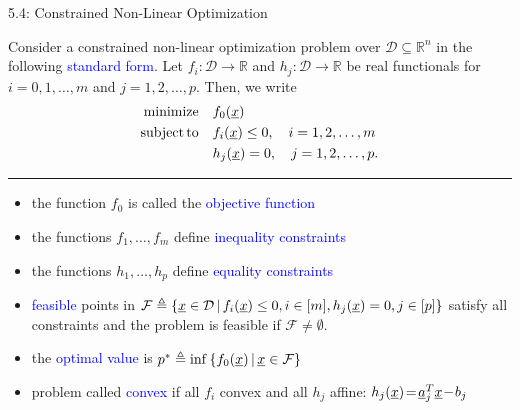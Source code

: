 \documentclass[10pt,letterpaper,english]{beamer}
\begin{document}
\begin{frame}{5.4: Constrained Non-Linear Optimization}

Consider a constrained non-linear optimization problem over $\mathcal{D} \subseteq \mathbb{R}^n$  in the following \textcolor{blue}{standard form}.
Let $f_i \colon \mathcal{D} \rightarrow \mathbb{R}$ and $h_j \colon \mathcal{D} \rightarrow \mathbb{R}$ be real functionals for $i=0,1,\ldots,m$ and $j=1,2,\ldots,p$.
Then, we write
\begin{align*}
\mathrm{minimize} \quad & f_0 (\underline{x}) \\
\mathrm{subject\,to} \quad & f_i (\underline{x}) \leq 0, \quad i=1,2,\ldots,m \\
& h_j (\underline{x}) = 0, \quad j=1,2,\ldots,p.
\end{align*}

\hrule

\begin{itemize}
\item<2-> the function $f_0$ is called the \textcolor{blue}{objective function}
\item<3-> the functions $f_1,\ldots,f_m$ define \textcolor{blue}{inequality constraints}
\item<4-> the functions $h_1,\ldots,h_p$ define \textcolor{blue}{equality constraints}
\item<5-> \textcolor{blue}{feasible} points in $\mathcal{F} \triangleq \{ \underline{x}\in \mathcal{D} \, | \,  f_i (\underline{x}) \leq 0, i\in [m], h_j (\underline{x}) = 0, j\in[p] \}$ satisfy all constraints and the problem is feasible if $\mathcal{F} \neq \emptyset$.
\item<6-> the \textcolor{blue}{optimal value} is $p^* \triangleq \inf \left\{ f_0 (\underline{x}) \, | \, \underline{x} \in \mathcal{F} \right\}$
\item<7-> problem called \textcolor{blue}{convex} if all $f_i$ convex and all $h_j$ affine: $h_j (\underline{x}) \!=\! \underline{a}_j^T \underline{x} \!-\! b_j \!\!\!$ 
\end{itemize}

\end{frame}
\end{document}

